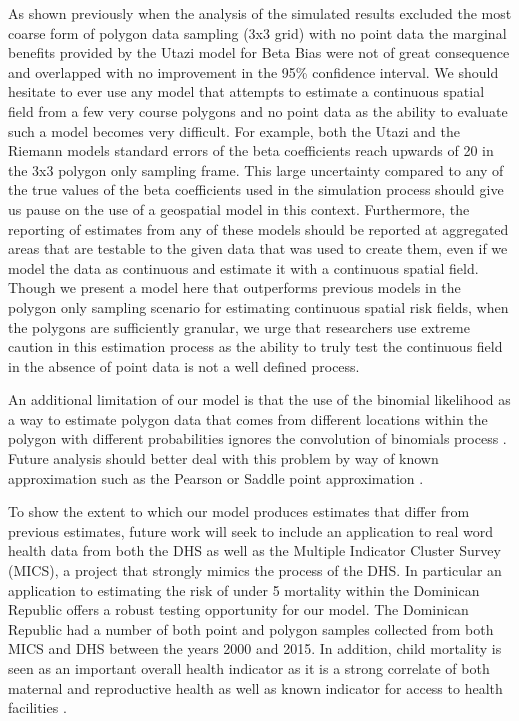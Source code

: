 \documentclass{article}
\begin{document}
As shown previously when the analysis of the simulated results excluded the most coarse form of polygon data sampling (3x3 grid) with no point data the marginal benefits provided by the Utazi model for Beta Bias were not of great consequence and overlapped with no improvement in the 95\% confidence interval. We should hesitate to ever use any model that attempts to estimate a continuous spatial field from a few very course polygons and no point data as the ability to evaluate such a model becomes very difficult. For example, both the Utazi and the Riemann models standard errors of the beta coefficients reach upwards of 20 in the 3x3 polygon only sampling frame. This large uncertainty compared to any of the true values of the beta coefficients used in the simulation process should give us pause on the use of a geospatial model in this context. Furthermore, the reporting of estimates from any of these models should be reported at aggregated areas that are testable to the given data that was used to create them, even if we model the data as continuous and estimate it with a continuous spatial field. Though we present a model here that outperforms previous models in the polygon only sampling scenario for estimating continuous spatial risk fields, when the polygons are sufficiently granular, we urge that researchers use extreme caution in this estimation process as the ability to truly test the continuous field in the absence of point data is not a well defined process. 

An additional limitation of our model is that the use of the binomial likelihood as a way to estimate polygon data that comes from different locations within the polygon with different probabilities ignores the convolution of binomials process \cite{Butler1993}. Future analysis should better deal with this problem by way of known approximation such as the Pearson or Saddle point approximation \cite{Liu2017}.

To show the extent to which our model produces estimates that differ from previous estimates, future work will seek to include an application to real word health data from both the DHS as well as the Multiple Indicator Cluster Survey (MICS), a project that strongly mimics the process of the DHS. In particular an application to estimating the risk of under 5 mortality within the Dominican Republic offers a robust testing opportunity for our model. The Dominican Republic had a number of both point and polygon samples collected from both MICS and DHS between the years 2000 and 2015. In addition, child mortality is seen as an important overall health indicator as it is a strong correlate of both maternal and reproductive health as well as known indicator for access to health facilities \cite{AbouZahr2015}.
\end{document}
